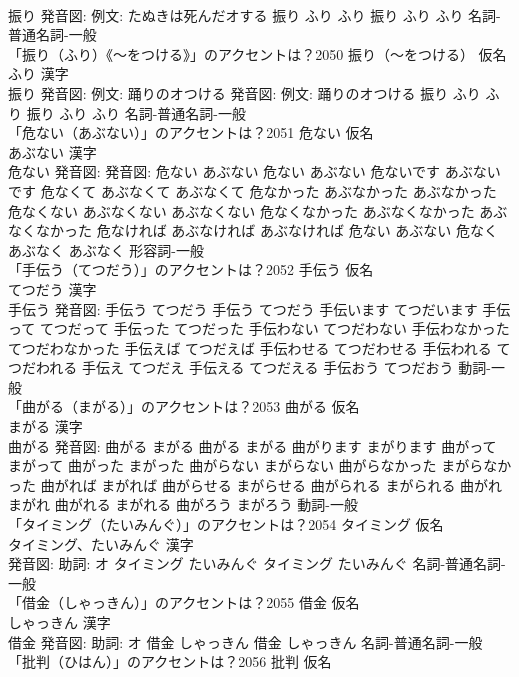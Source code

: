 \documentclass[8pt]{extreport}
\begin{document}
\begin{CJK}{UTF8}{min}
\\	振り 発音図: 例文: たぬきは死んだオする	振り ふり ふり		振り ふり ふり				名詞-普通名詞-一般 
\\	「振り（ふり）《〜をつける》」のアクセントは？2050	振り（〜をつける） 仮名　
\\	ふり 漢字　
\\	振り 発音図: 例文: 踊りのオつける 発音図: 例文: 踊りのオつける	振り ふり ふり		振り ふり ふり				名詞-普通名詞-一般 
\\	「危ない（あぶない）」のアクセントは？2051	危ない 仮名　
\\	あぶない 漢字　
\\	危ない 発音図: 発音図:	危ない あぶない		危ない あぶない 危ないです あぶないです 危なくて あぶなくて あぶなくて 危なかった あぶなかった あぶなかった 危なくない あぶなくない あぶなくない 危なくなかった あぶなくなかった あぶなくなかった 危なければ あぶなければ あぶなければ 危ない あぶない 危なく あぶなく あぶなく				形容詞-一般 
\\	「手伝う（てつだう）」のアクセントは？2052	手伝う 仮名　
\\	てつだう 漢字　
\\	手伝う 発音図:	手伝う てつだう		手伝う てつだう 手伝います てつだいます 手伝って てつだって 手伝った てつだった 手伝わない てつだわない 手伝わなかった てつだわなかった 手伝えば てつだえば 手伝わせる てつだわせる 手伝われる てつだわれる 手伝え てつだえ 手伝える てつだえる 手伝おう てつだおう				動詞-一般 
\\	「曲がる（まがる）」のアクセントは？2053	曲がる 仮名　
\\	まがる 漢字　
\\	曲がる 発音図:	曲がる まがる		曲がる まがる 曲がります まがります 曲がって まがって 曲がった まがった 曲がらない まがらない 曲がらなかった まがらなかった 曲がれば まがれば 曲がらせる まがらせる 曲がられる まがられる 曲がれ まがれ 曲がれる まがれる 曲がろう まがろう				動詞-一般 
\\	「タイミング（たいみんぐ）」のアクセントは？2054	タイミング 仮名　
\\	タイミング、たいみんぐ 漢字　
\\	発音図: 助詞: オ	タイミング たいみんぐ		タイミング たいみんぐ				名詞-普通名詞-一般 
\\	「借金（しゃっきん）」のアクセントは？2055	借金 仮名　
\\	しゃっきん 漢字　
\\	借金 発音図: 助詞: オ	借金 しゃっきん		借金 しゃっきん				名詞-普通名詞-一般 
\\	「批判（ひはん）」のアクセントは？2056	批判 仮名　

\end{CJK}
\end{document}
